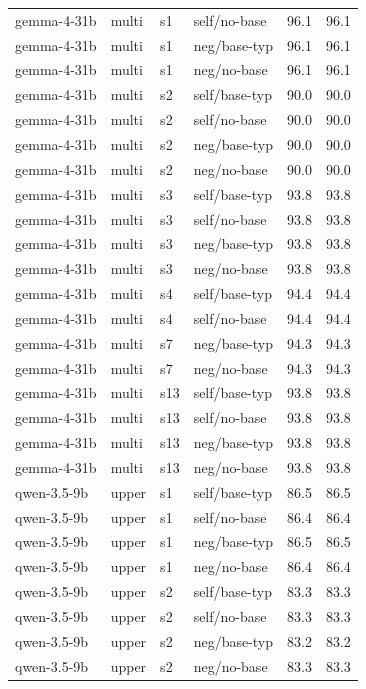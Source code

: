 {\begin{longtable}{llll rr}
gemma-4-31b & multi & s1 & self/no-base & 96.1 & 96.1 \\
gemma-4-31b & multi & s1 & neg/base-typ & 96.1 & 96.1 \\
gemma-4-31b & multi & s1 & neg/no-base & 96.1 & 96.1 \\
gemma-4-31b & multi & s2 & self/base-typ & 90.0 & 90.0 \\
gemma-4-31b & multi & s2 & self/no-base & 90.0 & 90.0 \\
gemma-4-31b & multi & s2 & neg/base-typ & 90.0 & 90.0 \\
gemma-4-31b & multi & s2 & neg/no-base & 90.0 & 90.0 \\
gemma-4-31b & multi & s3 & self/base-typ & 93.8 & 93.8 \\
gemma-4-31b & multi & s3 & self/no-base & 93.8 & 93.8 \\
gemma-4-31b & multi & s3 & neg/base-typ & 93.8 & 93.8 \\
gemma-4-31b & multi & s3 & neg/no-base & 93.8 & 93.8 \\
gemma-4-31b & multi & s4 & self/base-typ & 94.4 & 94.4 \\
gemma-4-31b & multi & s4 & self/no-base & 94.4 & 94.4 \\
gemma-4-31b & multi & s7 & neg/base-typ & 94.3 & 94.3 \\
gemma-4-31b & multi & s7 & neg/no-base & 94.3 & 94.3 \\
gemma-4-31b & multi & s13 & self/base-typ & 93.8 & 93.8 \\
gemma-4-31b & multi & s13 & self/no-base & 93.8 & 93.8 \\
gemma-4-31b & multi & s13 & neg/base-typ & 93.8 & 93.8 \\
gemma-4-31b & multi & s13 & neg/no-base & 93.8 & 93.8 \\
\midrule
qwen-3.5-9b & upper & s1 & self/base-typ & 86.5 & 86.5 \\
qwen-3.5-9b & upper & s1 & self/no-base & 86.4 & 86.4 \\
qwen-3.5-9b & upper & s1 & neg/base-typ & 86.5 & 86.5 \\
qwen-3.5-9b & upper & s1 & neg/no-base & 86.4 & 86.4 \\
qwen-3.5-9b & upper & s2 & self/base-typ & 83.3 & 83.3 \\
qwen-3.5-9b & upper & s2 & self/no-base & 83.3 & 83.3 \\
qwen-3.5-9b & upper & s2 & neg/base-typ & 83.2 & 83.2 \\
qwen-3.5-9b & upper & s2 & neg/no-base & 83.3 & 83.3 \\

\end{longtable}}
